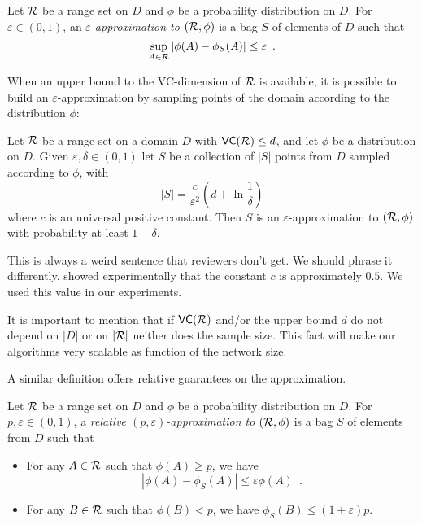 \begin{definition}\label{def:eapprox}
  Let $\mathcal{R}$ be a range set on %
  $D$ and $\phi$ be a probability distribution on $D$. For $\varepsilon\in(0,1)$,
  an \emph{$\varepsilon$-approximation to $(\mathcal{R},\phi)$} is a bag $S$ of
  elements of $D$ such that 
  \[
  \sup_{A\in\mathcal{R}}|\phi(A)-\phi_S(A)|\le\varepsilon\enspace.\]
\end{definition}

When an upper bound to the VC-dimension of $\mathcal{R}$ is available, it is possible
to build an $\varepsilon$-approximation by sampling points of
the domain according to the distribution $\phi$:

\begin{theorem}\label{thm:eapprox}
  Let $\mathcal{R}$ be a range set on a domain $D$ with
  $\mathsf{VC}(\mathcal{R})\le d$, and let $\phi$ be a distribution on $D$. Given
  $\varepsilon,\delta\in(0,1)$ let $S$ be a collection of $|S|$ points from $D$
  sampled according to $\phi$, with
  \begin{equation}\label{eq:vceapprox}
	|S|=\frac{c}{\varepsilon^2}\left(d+\ln\frac{1}{\delta}\right)
  \end{equation}
  where $c$ is an universal positive constant. Then $S$ is an
  $\varepsilon$-approximation to $(\mathcal{R},\phi)$ with probability at least
  $1-\delta$.
\end{theorem}
\XXX This is always a weird sentence that reviewers don't get. We should phrase it differently.
\citet{LofflerP09} showed experimentally that the constant $c$ is approximately
$0.5$. We used this value in our experiments.

It is important to mention that if $\mathsf{VC}(\mathcal{R})$ and/or the upper bound $d$ do
not depend on $|D|$ or on $|\mathcal{R}|$ neither does the sample size. This fact
will make our algorithms very scalable as function of the network size.

A similar definition offers relative guarantees on the approximation.
\begin{definition}\label{def:releapprox}
  Let $\mathcal{R}$ be a range set on $D$ and $\phi$ be a probability distribution on
  $D$. For $p,\varepsilon\in (0,1)$, a \emph{relative
  $(p,\varepsilon)$-approximation to $(\mathcal{R},\phi)$} is a bag $S$ of elements
  from $D$ such that 
  \begin{itemize}
    \item For any $A\in\mathcal{R}$ such that $\phi(A)\ge p$, we have 
      \[ |\phi(A) - \phi_S(A)|\le \varepsilon\phi(A)\enspace.\]
    \item For any $B\in\mathcal{R}$ such that $\phi(B)< p$, we have $\phi_S(B)\le
      (1+\varepsilon)p$.
  \end{itemize}
\end{definition}

